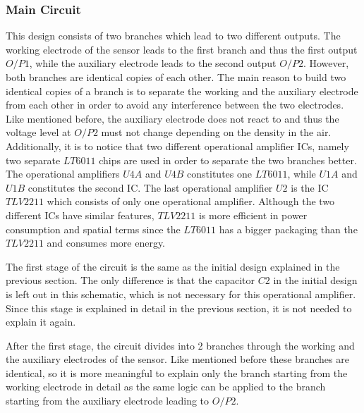 \subsubsection{Main Circuit}
This design consists of two branches which lead to two different outputs. The working electrode of the sensor leads to the first branch and thus the first output $O/P1$, while the auxiliary electrode leads to the second output $O/P2$. However, both branches are identical copies of each other. The main reason to build two identical copies of a branch is to separate the working and the auxiliary electrode from each other in order to avoid any interference between the two electrodes. Like mentioned before, the auxiliary electrode does not react to  and thus the voltage level at $O/P2$ must not change depending on the  density in the air. Additionally, it is to notice that two different operational amplifier ICs, namely two separate $LT6011$ chips are used in order to separate the two branches better. The operational amplifiers $U4A$ and $U4B$ constitutes one $LT6011$, while $U1A$ and $U1B$ constitutes the second IC. The last operational amplifier $U2$ is the IC $TLV2211$ which consists of only one operational amplifier. Although the two different ICs have similar features, $TLV2211$ is more efficient in power consumption and spatial terms since the $LT6011$ has a bigger packaging than the $TLV2211$ and consumes more energy. \cite{TLV2211} \cite{LT6011}\par
The first stage of the circuit is the same as the initial design explained in the previous section. The only difference is that the capacitor $C2$ in the initial design is left out in this schematic, which is not necessary for this operational amplifier. \cite{2009} Since this stage is explained in detail in the previous section, it is not needed to explain it again. \par 
After the first stage, the circuit divides into 2 branches through the working and the auxiliary electrodes of the sensor. Like mentioned before these branches are identical, so it is more meaningful to explain only the branch starting from the working electrode in detail as the same logic can be applied to the branch starting from the auxiliary electrode leading to $O/P2$.\par
